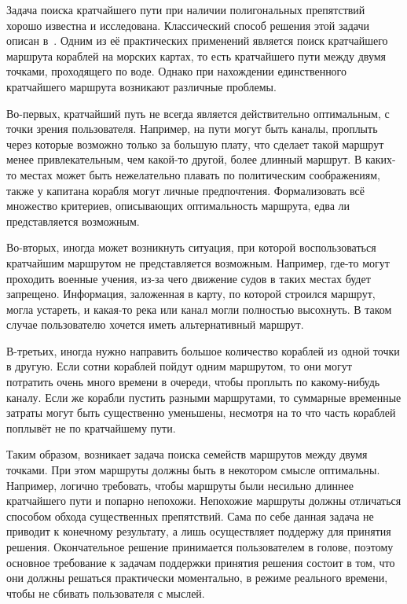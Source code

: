 \startprefacepage

Задача поиска кратчайшего пути при наличии полигональных препятствий
хорошо известна и исследована. Классический способ решения этой задачи
описан в~\cite{de2000computational}. Одним из её практических
применений является поиск кратчайшего маршрута кораблей на морских
картах, то есть кратчайшего пути между двумя точками, проходящего по
воде. Однако при нахождении единственного кратчайшего маршрута
возникают различные проблемы.

Во-первых, кратчайший путь не всегда является действительно
оптимальным, с точки зрения пользователя. Например, на пути могут быть
каналы, проплыть через которые возможно только за большую плату, что
сделает такой маршрут менее привлекательным, чем какой-то другой,
более длинный маршрут. В каких-то местах может быть нежелательно
плавать по политическим соображениям, также у капитана корабля могут
личные предпочтения. Формализовать всё множество критериев,
описывающих оптимальность маршрута, едва ли представляется возможным.

Во-вторых, иногда может возникнуть ситуация, при которой
воспользоваться кратчайшим маршрутом не представляется возможным.
Например, где-то могут проходить военные учения, из-за чего движение
судов в таких местах будет запрещено. Информация, заложенная в карту,
по которой строился маршрут, могла устареть, и какая-то река или канал
могли полностью высохнуть. В таком случае пользователю хочется иметь
альтернативный маршрут.

В-третьих, иногда нужно направить большое количество кораблей из одной
точки в другую. Если сотни кораблей пойдут одним маршрутом, то они
могут потратить очень много времени в очереди, чтобы проплыть по
какому-нибудь каналу. Если же корабли пустить разными маршрутами, то
суммарные временные затраты могут быть существенно уменьшены, несмотря
на то что часть кораблей поплывёт не по кратчайшему пути.

Таким образом, возникает задача поиска семейств маршрутов между двумя
точками. При этом маршруты должны быть в некотором смысле оптимальны.
Например, логично требовать, чтобы маршруты были несильно длиннее
кратчайшего пути и попарно непохожи. Непохожие маршруты должны
отличаться способом обхода существенных препятствий. Сама по себе
данная задача не приводит к конечному результату, а лишь осуществляет
поддержу для принятия решения. Окончательное решение принимается
пользователем в голове, поэтому основное требование к задачам
поддержки принятия решения состоит в том, что они должны решаться
практически моментально, в режиме реального времени, чтобы не сбивать
пользователя с мыслей.

